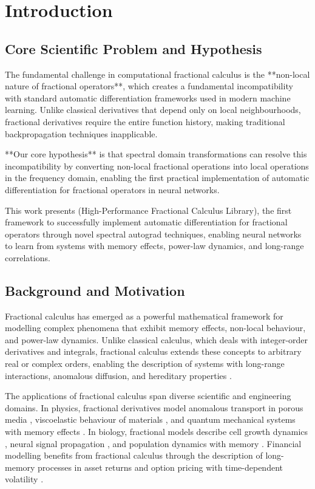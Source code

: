 \section{Introduction}

\subsection{Core Scientific Problem and Hypothesis}

The fundamental challenge in computational fractional calculus is the **non-local nature of fractional operators**, which creates a fundamental incompatibility with standard automatic differentiation frameworks used in modern machine learning. Unlike classical derivatives that depend only on local neighbourhoods, fractional derivatives require the entire function history, making traditional backpropagation techniques inapplicable.

**Our core hypothesis** is that spectral domain transformations can resolve this incompatibility by converting non-local fractional operations into local operations in the frequency domain, enabling the first practical implementation of automatic differentiation for fractional operators in neural networks.

This work presents \hpfracc (High-Performance Fractional Calculus Library), the first framework to successfully implement automatic differentiation for fractional operators through novel spectral autograd techniques, enabling neural networks to learn from systems with memory effects, power-law dynamics, and long-range correlations.

\subsection{Background and Motivation}

Fractional calculus has emerged as a powerful mathematical framework for modelling complex phenomena that exhibit memory effects, non-local behaviour, and power-law dynamics. Unlike classical calculus, which deals with integer-order derivatives and integrals, fractional calculus extends these concepts to arbitrary real or complex orders, enabling the description of systems with long-range interactions, anomalous diffusion, and hereditary properties \citep{podlubny1999fractional, kilbas2006theory}.

The applications of fractional calculus span diverse scientific and engineering domains. In physics, fractional derivatives model anomalous transport in porous media \citep{metzler2000random}, viscoelastic behaviour of materials \citep{mainardi2010fractional}, and quantum mechanical systems with memory effects \citep{laskin2000fractional}. In biology, fractional models describe cell growth dynamics \citep{west2003fractional}, neural signal propagation \citep{anastasio1994fractional}, and population dynamics with memory \citep{petras2011fractional}. Financial modelling benefits from fractional calculus through the description of long-memory processes in asset returns \citep{cont2001empirical} and option pricing with time-dependent volatility \citep{cartea2007fractional}.

